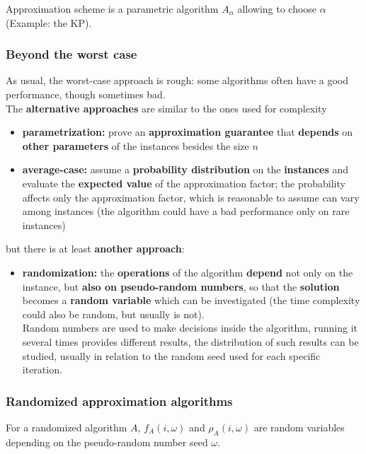 Approximation scheme is a parametric algorithm $A_\alpha$ allowing to choose $\alpha$ (Example: the KP).\\

\newpage

\subsubsection{Beyond the worst case}
As usual, the worst-case approach is rough: some algorithms often have a good performance, though sometimes bad.\\

The \textbf{alternative approaches} are similar to the ones used for complexity
\begin{itemize}
	\item \textbf{parametrization:} prove an \textbf{approximation guarantee} that \textbf{depends} on \textbf{other parameters} of the instances besides the size $n$
	\item \textbf{average-case:} assume a \textbf{probability distribution} on the \textbf{instances} and evaluate the \textbf{expected value} of the approximation factor; the probability affects only the approximation factor, which is reasonable to assume can vary among instances (the algorithm could have a bad performance only on rare instances)
\end{itemize}

but there is at least \textbf{another approach}: 
\begin{itemize}
	\item \textbf{randomization:} the \textbf{operations} of the algorithm \textbf{depend} not only on the instance, but \textbf{also on pseudo-random numbers}, so that the \textbf{solution} becomes a \textbf{random variable} which can be investigated (the time complexity could also be random, but usually is not).\\ 
	Random numbers are used to make decisions inside the algorithm, running it several times provides different results, the distribution of such results can be studied, usually in relation to the random seed used for each specific iteration. \\
\end{itemize}

\newpage

\subsubsection{Randomized approximation algorithms}
For a randomized algorithm $A$, $f_A (i , \omega)$ and $\rho_A (i , \omega)$ are random variables depending on the pseudo-random number seed $\omega$.\\


